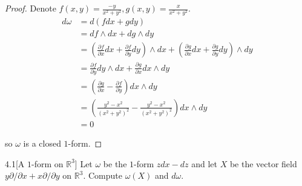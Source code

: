 \begin{proof}
    Denote \(f(x,y) = \frac{-y}{x^{2} + y^{2}}, g(x,y) = \frac{x}{x^{2} + y^{2}}\).
    \begingroup
    \allowdisplaybreaks%
    \begin{align*}
        d\omega & = d\left(fdx + gdy\right)                                                                                                                                                             \\
                & = df \wedge dx + dg \wedge dy                                                                                                                                                         \\
                & = \left(\frac{\partial f}{\partial x}dx + \frac{\partial f}{\partial y}dy\right) \wedge dx + \left(\frac{\partial g}{\partial x}dx + \frac{\partial g}{\partial y}dy\right) \wedge dy \\
                & = \frac{\partial f}{\partial y} dy\wedge dx + \frac{\partial g}{\partial x} dx\wedge dy                                                                                               \\
                & = \left(\frac{\partial g}{\partial x} - \frac{\partial f}{\partial y}\right) dx \wedge dy                                                                                             \\
                & = \left(\frac{y^{2} - x^{2}}{{(x^{2} + y^{2})}^{2}} - \frac{y^{2} - x^{2}}{{(x^{2} + y^{2})}^{2}}\right) dx \wedge dy                                                                 \\
                & = 0
    \end{align*}
    \endgroup

    so \( \omega \) is a closed \(1\)-form.
\end{proof}

\begin{problem}{4.1}[A \(1\)-form on \(\mathbb{R}^{3}\)]
Let \(\omega\) be the \(1\)-form \(zdx - dz\) and let \(X\) be the vector field \(y\partial/\partial x + x\partial/\partial y\) on \(\mathbb{R}^{3}\). Compute \(\omega(X)\) and \(d\omega\).
\end{problem}


